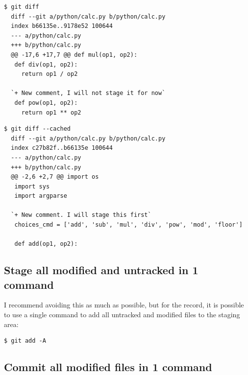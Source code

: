 \documentclass[a4paper]{../../common/tufte-latex/tufte-handout}
\begin{document}
\begin{lstlisting}[style=BashInputStyle]
  $ git diff
  diff --git a/python/calc.py b/python/calc.py
  index b66135e..9178e52 100644
  --- a/python/calc.py
  +++ b/python/calc.py
  @@ -17,6 +17,7 @@ def mul(op1, op2):
   def div(op1, op2):
     return op1 / op2
 
  `+ New comment, I will not stage it for now`
   def pow(op1, op2):
     return op1 ** op2
 \end{lstlisting}
 \begin{lstlisting}[style=BashInputStyle]
  $ git diff --cached
  diff --git a/python/calc.py b/python/calc.py
  index c27b82f..b66135e 100644
  --- a/python/calc.py
  +++ b/python/calc.py
  @@ -2,6 +2,7 @@ import os
   import sys
   import argparse
 
  `+ New comment. I will stage this first`
   choices_cmd = ['add', 'sub', 'mul', 'div', 'pow', 'mod', 'floor']
 
   def add(op1, op2):
\end{lstlisting}

\subsection{Stage all modified and untracked in 1 command}

I recommend avoiding this as much as possible, but for the record, it is possible to use a single command to add all untracked and modified files to the staging area:

\begin{lstlisting}[style=BashInputStyle]
  $ git add -A
\end{lstlisting}

\subsection{Commit all modified files in 1 command}
\end{document}
